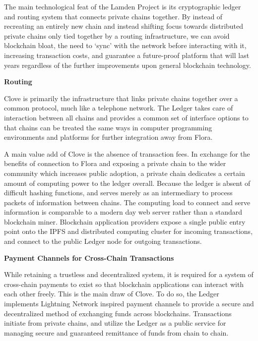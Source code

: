 \documentclass{%
	article}
\begin{document}
The main technological feat of the Lamden Project is its cryptographic ledger and routing system that connects private chains together. By instead of recreating an entirely new chain and instead shifting focus towards distributed private chains only tied together by a routing infrastructure, we can avoid blockchain bloat, the need to ‘sync’ with the network before interacting with it, increasing transaction costs, and guarantee a future-proof platform that will last years regardless of the further improvements upon general blockchain technology.

\begin{center}
\textbf{Routing}
\end{center}

Clove is primarily the infrastructure that links private chains together over a common protocol, much like a telephone network. The Ledger takes care of interaction between all chains and provides a common set of interface options to that chains can be treated the same ways in computer programming environments and platforms for further integration away from Flora.

A main value add of Clove is the absence of transaction fees. In exchange for the benefits of connection to Flora and exposing a private chain to the wider community which increases public adoption, a private chain dedicates a certain amount of computing power to the ledger overall. Because the ledger is absent of difficult hashing functions, and serves merely as an intermediary to process packets of information between chains. The computing load to connect and serve information is comparable to a modern day web server rather than a standard blockchain miner\cite{bigchaindb}. Blockchain application providers expose a single public entry point onto the IPFS and distributed computing cluster for incoming transactions, and connect to the public Ledger node for outgoing transactions.

\begin{center}
\textbf{Payment Channels for Cross-Chain Transactions}
\end{center}

While retaining a trustless and decentralized system, it is required for a system of cross-chain payments to exist so that blockchain applications can interact with each other freely. This is the main draw of Clove. To do so, the Ledger implements Lightning Network\cite{lightning} inspired payment channels to provide a secure and decentralized method of exchanging funds across blockchains. Transactions initiate from private chains, and utilize the Ledger as a public service for managing secure and guaranteed remittance of funds from chain to chain.
\end{document}
